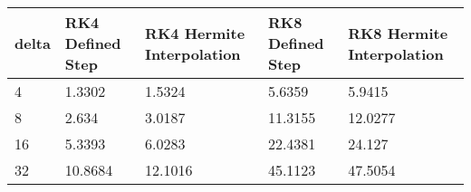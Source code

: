 \begin{tabular}{lllll}
delta & RK4 Defined Step & RK4 Hermite Interpolation & RK8 Defined Step & RK8 Hermite Interpolation \\ 
\hline 
4 & 1.3302 & 1.5324 & 5.6359 & 5.9415 \\ 
8 & 2.634 & 3.0187 & 11.3155 & 12.0277 \\ 
16 & 5.3393 & 6.0283 & 22.4381 & 24.127 \\ 
32 & 10.8684 & 12.1016 & 45.1123 & 47.5054 \\ 
\hline 
\end{tabular}